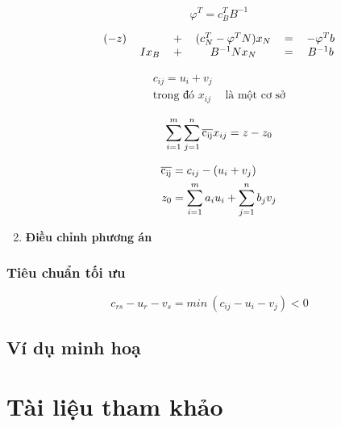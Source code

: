 \documentclass{article}
\begin{document}
\begin{enumerate}
                    \begin{equation}
                        \varphi^T = c^T_B B^{-1}
                    \end{equation}

                    \begin{equation}
                        \begin{tabular} {cccccc}
                            $(-z)$ &&$+$& $(c^T_N - \varphi^T N) x_N$ &$=$& $-\varphi^T b$ \\
                            & $Ix_B$ &$+$& $B^{-1} N x_N$ &$=$& $B^{-1}b$
                        \end{tabular}
                    \end{equation}

                    \begin{equation}
                        \begin{split}
                        c_{ij} = u_{i} + v_{j} \\
                        \text{trong đó } x_{ij}& \text{ là một cơ sở}
                        \end{split}
                    \end{equation}
                    
                    \begin{equation}
                        \sum_{i=1}^m \sum_{j=1}^n \overline{\rm c_{ij}} x_{ij} = z - z_0
                    \end{equation}

                    \begin{equation}
                        \begin{split}
                        \overline{\rm c_{ij}} &= c_{ij} - (u_i + v_j) \\
                        z_0 &= \sum_{i=1}^m a_i u_i + \sum_{j=1}^n b_j v_j
                        \end{split}
                    \end{equation}
                \item \textbf{Điều chỉnh phương án}
            \end{enumerate}
        \subsubsection{Tiêu chuẩn tối ưu}
            \begin{equation}
                c_{rs} - u_r - v_s = min \: (c_{ij} - u_i - v_j) < 0
            \end{equation}
    \subsection{Ví dụ minh hoạ}

\section{Tài liệu tham khảo}



\end{document}
